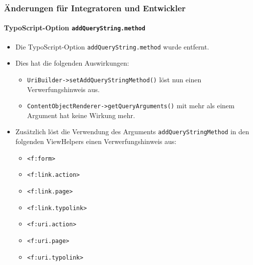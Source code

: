 %

\begin{frame}[fragile]
	\frametitle{Änderungen für Integratoren und Entwickler}
	\framesubtitle{TypoScript-Option \texttt{addQueryString.method}}

	\begin{itemize}
		\item Die TypoScript-Option \texttt{addQueryString.method} wurde entfernt.
		\item Dies hat die folgenden Auswirkungen:

			\begin{itemize}\smaller
				\item \texttt{UriBuilder->setAddQueryStringMethod()} löst nun einen Verwerfungshinweis aus.
				\item \texttt{ContentObjectRenderer->getQueryArguments()} mit mehr als einem Argument hat keine Wirkung mehr.
			\end{itemize}\normalsize

		\item Zusätzlich löst die Verwendung des Arguments \texttt{addQueryStringMethod} in
			den folgenden ViewHelpers einen Verwerfungshinweis aus:

			\begin{itemize}\smaller
				\item \texttt{<f:form>}
				\item \texttt{<f:link.action>}
				\item \texttt{<f:link.page>}
				\item \texttt{<f:link.typolink>}
				\item \texttt{<f:uri.action>}
				\item \texttt{<f:uri.page>}
				\item \texttt{<f:uri.typolink>}
			\end{itemize}\normalsize

	\end{itemize}

\end{frame}

